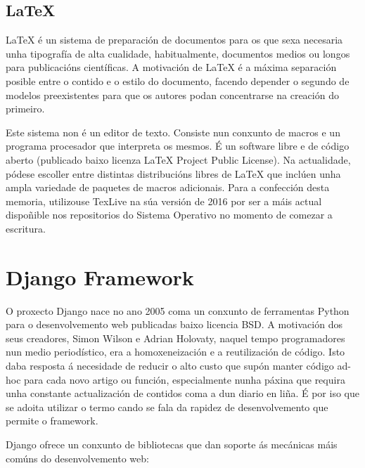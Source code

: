 \subsection{LaTeX}
\label{latex}

LaTeX é un sistema de preparación de documentos para os que sexa necesaria unha tipografía de alta cualidade, habitualmente, documentos medios ou longos para publicacións científicas. A motivación de LaTeX é a máxima separación posible entre o contido e o estilo do documento, facendo depender o segundo de modelos preexistentes para que os autores podan concentrarse na creación do primeiro.

Este sistema non é un editor de texto. Consiste nun conxunto de macros e un programa procesador que interpreta os mesmos. É un software libre e de código aberto (publicado baixo licenza  LaTeX Project Public License\cite{latex}). Na actualidade, pódese escoller entre distintas  distribucións libres de LaTeX que inclúen unha ampla variedade de paquetes de macros adicionais. Para a confección desta memoria, utilizouse TexLive na súa versión de 2016 por ser a máis actual dispoñible nos repositorios do Sistema Operativo no momento de comezar a escritura.






\section{Django Framework}
\label{django}
O proxecto Django nace no ano 2005 coma un conxunto de ferramentas Python para o desenvolvemento web publicadas
baixo licencia BSD. A motivación dos seus creadores, Simon Wilson e Adrian Holovaty, naquel tempo programadores
nun medio periodístico, era a homoxeneización e a reutilización de código. Isto daba resposta á necesidade de reducir
o alto custo que supón manter código ad-hoc para cada novo artigo ou función, especialmente nunha páxina que
requira unha constante actualización de contidos coma a dun diario en liña. É por iso que se adoita utilizar o 
termo  cando se fala da rapidez de desenvolvemento que permite o framework\cite{django1}.  

Django ofrece un conxunto de bibliotecas que dan soporte ás mecánicas máis comúns do desenvolvemento
web:

